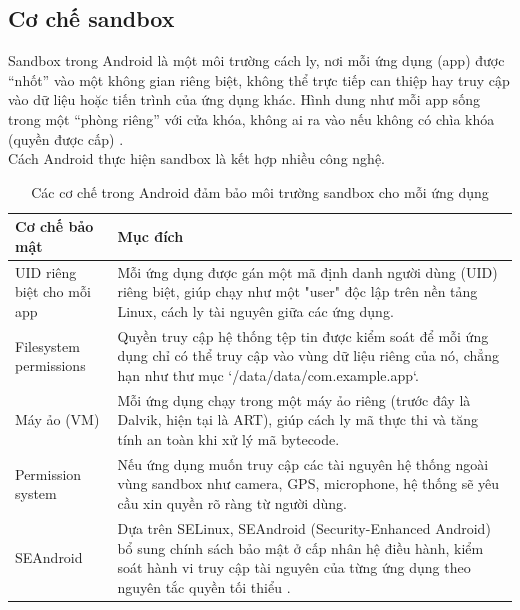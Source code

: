 \subsection{Cơ chế sandbox}
\renewcommand{\labelitemi}{--}    
        \hspace*{0.8cm}Sandbox trong Android là một môi trường cách ly, nơi mỗi ứng dụng (app) được “nhốt” vào một không gian riêng biệt, không thể trực tiếp can thiệp hay truy cập vào dữ liệu hoặc tiến trình của ứng dụng khác. Hình dung như mỗi app sống trong một “phòng riêng” với cửa khóa, không ai ra vào nếu không có chìa khóa (quyền được cấp) \cite{app-sandbox}.\\
        \setlength{\leftmargini}{1.5cm}
        \hspace*{0.8cm}Cách Android thực hiện sandbox là kết hợp nhiều công nghệ.
        \begin{table}[H]
            \centering
            \renewcommand{\arraystretch}{1.5}
            \begin{tabular}{|p{4.5cm}|p{11cm}|}
                \hline
                \textbf{Cơ chế bảo mật} & \textbf{Mục đích} \\
                \hline
                UID riêng biệt cho mỗi app & Mỗi ứng dụng được gán một mã định danh người dùng (UID) riêng biệt, giúp chạy như một "user" độc lập trên nền tảng Linux, cách ly tài nguyên giữa các ứng dụng. \\
                \hline
                Filesystem permissions & Quyền truy cập hệ thống tệp tin được kiểm soát để mỗi ứng dụng chỉ có thể truy cập vào vùng dữ liệu riêng của nó, chẳng hạn như thư mục `/data/data/com.example.app`. \\
                \hline
                Máy ảo (VM) & Mỗi ứng dụng chạy trong một máy ảo riêng (trước đây là Dalvik, hiện tại là ART), giúp cách ly mã thực thi và tăng tính an toàn khi xử lý mã bytecode. \\
                \hline
                Permission system & Nếu ứng dụng muốn truy cập các tài nguyên hệ thống ngoài vùng sandbox như camera, GPS, microphone, hệ thống sẽ yêu cầu xin quyền rõ ràng từ người dùng. \\
                \hline
                SEAndroid & Dựa trên SELinux, SEAndroid (Security-Enhanced Android) bổ sung chính sách bảo mật ở cấp nhân hệ điều hành, kiểm soát hành vi truy cập tài nguyên của từng ứng dụng theo nguyên tắc quyền tối thiểu \cite{Android-Security-Overview}. \\
                \hline
            \end{tabular}
            \caption{Các cơ chế trong Android đảm bảo môi trường sandbox cho mỗi ứng dụng}
            \label{table:android-sandbox-mechanisms}
            \end{table}
            

